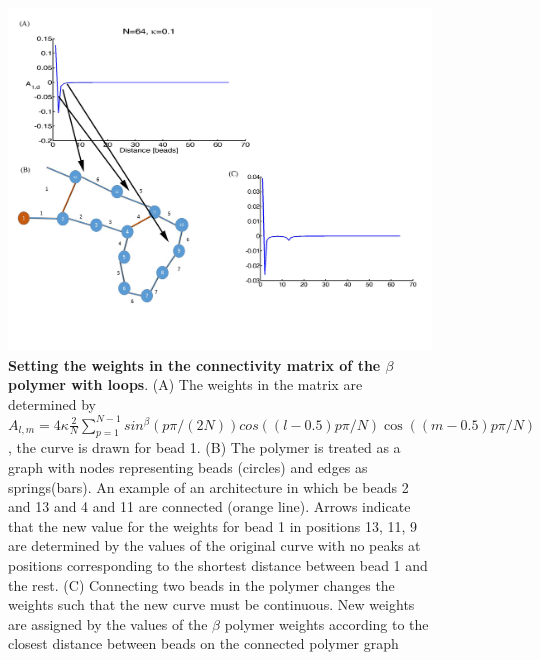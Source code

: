 \documentclass[12pt]{article}
\begin{document}
\begin{figure}[H]
\includegraphics[scale=0.5]{Figure05_betaModelWeights}
\caption{\textbf{Setting the weights in the connectivity matrix of the $\beta$ polymer with loops}. (A) The weights in the matrix are determined by $A_{l,m}= 4\kappa \frac{2}{N}\sum_{p=1}^{N-1} sin^{\beta}(p\pi/(2N))cos((l-0.5)p\pi/N)\cos((m-0.5)p\pi/N)$, the curve is drawn for bead 1. (B) The polymer is treated as a graph with nodes representing beads (circles) and edges as springs(bars). An example of an architecture in which be beads 2 and 13 and 4 and 11 are connected (orange line). Arrows indicate that the new value for the weights for bead 1 in positions 13, 11, 9 are determined by the values of the original curve with no peaks at positions corresponding to the shortest distance between bead 1 and the rest. (C) Connecting two beads in the polymer changes the weights such that the new curve must be continuous.  New weights are assigned by the values of the $\beta$ polymer weights according to the closest distance between beads on the connected polymer graph}
\label{settingBetsModelWeights}
\end{figure}
\end{document}
